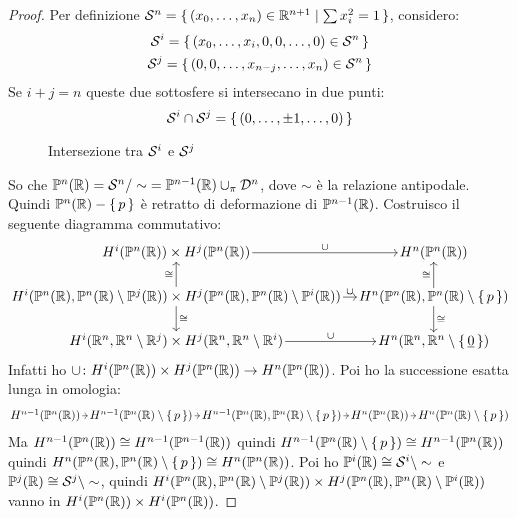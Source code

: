 \begin{proof}
  Per definizione $ \mathcal{S}^{n} = \set{(x_0, \dots, x_n) \in \mathbb{R}^{n+1} | \sum x_i^2 = 1} $,
  considero:
  \begin{gather*}
    \mathcal{S}^{i} = \set{(x_0, \dots, x_{i}, 0, 0, \dots, 0) \in \mathcal{S}^{n}} \\
    \mathcal{S}^{j} = \set{(0, 0, \dots, x_{n-j}, \dots, x_n) \in \mathcal{S}^{n}}
  \end{gather*}
  Se $ i + j = n $ queste due sottosfere si intersecano in due punti:
  \[
    \mathcal{S}^{i} \cap \mathcal{S}^{j} = \set{(0,\dots,\pm1,\dots,0)}
  \]
  \begin{figure}[htbp]
    \centering
    \caption{Intersezione tra $ \mathcal{S}^{i} $ e $ \mathcal{S}^{j} $}
    \label{fig:lez18:intersection}
  \end{figure}
  So che $ \mathbb{P}^{n} (\mathbb{R}) = \mathcal{S}^{n} \slash \sim \; = \mathbb{P}^{n-1} (\mathbb{R}) \cup_\pi \mathcal{D}^{n} $, dove $ \sim $ è la
  relazione antipodale. Quindi $ \mathbb{P}^{n} (\mathbb{R}) - \set{p} $ è retratto di deformazione
  di $ \mathbb{P}^{n-1} (\mathbb{R}) $.
  Costruisco il seguente diagramma commutativo:
  \[
    \begin{tikzcd}[nodes = {column sep = 10pt, outer sep = 0pt, inner sep = 1.5pt}]
      H^i(\Pjr{n}) \times H^j(\Pjr{n}) \rar{\cup} & H^n(\Pjr{n}) \\
      H^i(\Pjr{n}, \Pjr{n} \setminus \Pjr{j}) \times H^j(\Pjr{n}, \Pjr{n} \setminus \Pjr{i}) \uar{\cong} \rar{\cup} \dar{\cong} & H^n(\Pjr{n}, \Pjr{n} \setminus \set{p}) \dar{\cong} \uar{\cong} \\
      H^i(\RN{n}, \RN{n} \setminus \RN{j}) \times H^j(\RN{n}, \RN{n} \setminus \RN{i})  \rar{\cup} & H^n(\RN{n}, \RN{n} \setminus \set{\vec{0}})
    \end{tikzcd}
  \]
  Infatti ho $ \cup \colon H^i(\mathbb{P}^{n} (\mathbb{R})) \times H^j(\mathbb{P}^{n} (\mathbb{R})) \to H^n(\mathbb{P}^{n} (\mathbb{R})) $. Poi ho la successione
  esatta lunga in omologia:
  \[
    \begin{tikzcd}[nodes = {column sep = 5pt, inner sep = 1.5pt}]
      H^{n-1}(\Pjr{n}) \rar & H^{n-1}(\Pjr{n} \setminus \set{p}) \rar & H^{n-1}(\Pjr{n}, \Pjr{n} \setminus \set{p}) \rar & H^n(\Pjr{n}) \rar & H^n(\Pjr{n} \setminus \set{p})
    \end{tikzcd}
  \]
  Ma $ H^{n-1}(\mathbb{P}^{n} (\mathbb{R})) \cong H^{n-1}(\mathbb{P}^{n-1} (\mathbb{R})) $ quindi $ H^{n-1}(\mathbb{P}^{n} (\mathbb{R}) \setminus \set{p}) \cong H^{n-1}(\mathbb{P}^{n} (\mathbb{R})) $
  quindi $ H^n(\mathbb{P}^{n} (\mathbb{R}), \mathbb{P}^{n} (\mathbb{R}) \setminus \set{p}) \cong H^n(\mathbb{P}^{n} (\mathbb{R})) $.
  Poi ho $ \mathbb{P}^{i} (\mathbb{R}) \cong \mathcal{S}^{i} \setminus \sim $ e $ \mathbb{P}^{j} (\mathbb{R}) \cong \mathcal{S}^{j} \setminus \sim $, quindi
  $ H^i(\mathbb{P}^{n} (\mathbb{R}), \mathbb{P}^{n} (\mathbb{R}) \setminus \mathbb{P}^{j} (\mathbb{R})) \times H^j(\mathbb{P}^{n} (\mathbb{R}), \mathbb{P}^{n} (\mathbb{R}) \setminus \mathbb{P}^{i} (\mathbb{R})) $ vanno
  in $ H^i(\mathbb{P}^{n} (\mathbb{R})) \times H^i(\mathbb{P}^{n} (\mathbb{R})) $.


\end{proof}
